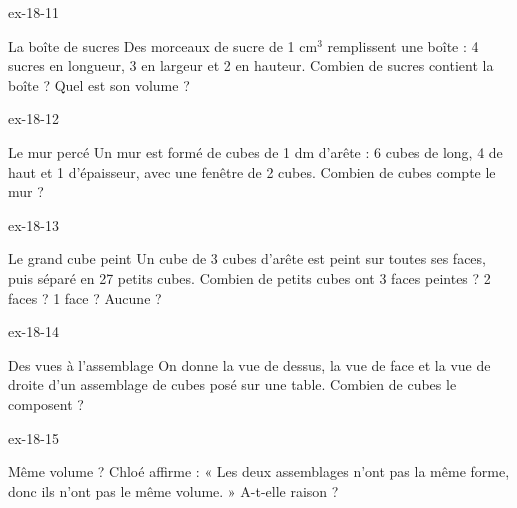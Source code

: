 \begin{blocLivre}{ex-18-11}\begin{exercice}[3]{La boîte de sucres}
Des morceaux de sucre de 1 cm$^3$ remplissent une boîte : 4 sucres en longueur, 3 en largeur et 2 en hauteur. Combien de sucres contient la boîte ? Quel est son volume ?
\label{fig-ex-18-11}
\end{exercice}\end{blocLivre}
\begin{blocLivre}{ex-18-12}\begin{exercice}[3]{Le mur percé}
Un mur est formé de cubes de 1 dm d’arête : 6 cubes de long, 4 de haut et 1 d’épaisseur, avec une fenêtre de 2 cubes. Combien de cubes compte le mur ?
\label{fig-ex-18-12}
\end{exercice}\end{blocLivre}
\begin{blocLivre}{ex-18-13}\begin{exercice}[3]{Le grand cube peint}
Un cube de 3 cubes d’arête est peint sur toutes ses faces, puis séparé en 27 petits cubes. Combien de petits cubes ont 3 faces peintes ? 2 faces ? 1 face ? Aucune ?
\label{fig-ex-18-13}
\end{exercice}\end{blocLivre}
\begin{blocLivre}{ex-18-14}\begin{exercice}[3]{Des vues à l’assemblage}
On donne la vue de dessus, la vue de face et la vue de droite d’un assemblage de cubes posé sur une table. Combien de cubes le composent ?
\label{fig-ex-18-14}
\end{exercice}\end{blocLivre}
\begin{blocLivre}{ex-18-15}\begin{exercice}[3]{Même volume ?}
Chloé affirme : « Les deux assemblages n’ont pas la même forme, donc ils n’ont pas le même volume. » A-t-elle raison ?
\label{fig-ex-18-15}
\end{exercice}\end{blocLivre}

\clearpage
